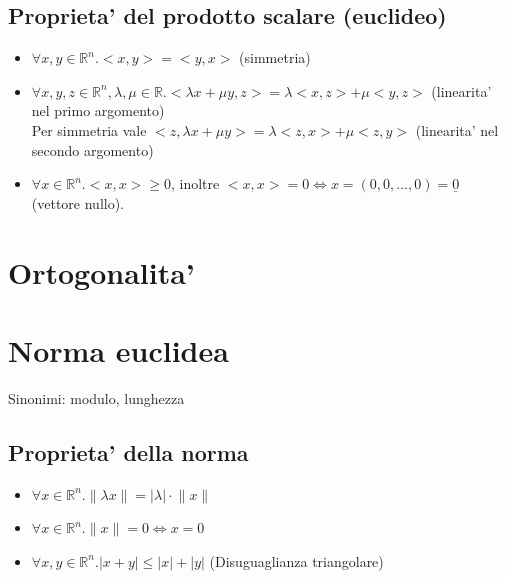 \documentclass{report}
\begin{document}
\subsection{Proprieta' del prodotto scalare (euclideo)}
\begin{itemize}
  \item $ \forall x,y \in \mathbb{R}^n. <x,y> = <y,x> $ (simmetria)
  \item $ \forall x,y,z \in \mathbb{R}^n, \lambda, \mu \in \mathbb{R}. <\lambda x+\mu y, z> = \lambda<x,z> + \mu<y,z> $ (linearita' nel primo argomento)\\
    Per simmetria vale $ <z, \lambda x + \mu y> = \lambda<z,x> + \mu<z,y> $ (linearita' nel secondo argomento)
  \item $ \forall x \in \mathbb{R}^n. <x,x> \geq 0 $, inoltre $ <x,x> = 0 \iff x = (0,0,...,0) = \underline{0} $ (vettore nullo). 
\end{itemize}

\section{Ortogonalita'}

\section{Norma euclidea}
Sinonimi: modulo, lunghezza
\subsection{Proprieta' della norma}
\begin{itemize}
\item $ \forall x \in \mathbb{R}^n. \lVert \lambda x \rVert = |\lambda| \cdot \lVert x \rVert $
\item $ \forall x \in \mathbb{R}^n. \lVert x \rVert = 0 \iff x = 0 $
\item $ \forall x,y \in \mathbb{R}^n. |x+y| \leq |x|+|y| $ (Disuguaglianza triangolare)
\end{itemize}
\end{document}
